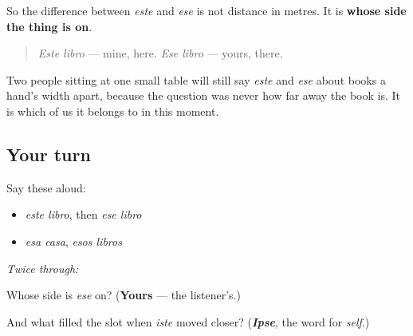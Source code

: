 \begin{culture}
So the difference between \emph{este} and \emph{ese} is not distance in metres. It is \textbf{whose side the thing is on}.

\begin{quote}
\emph{Este libro} — mine, here. \emph{Ese libro} — yours, there.
\end{quote}

Two people sitting at one small table will still say \emph{este} and \emph{ese} about books a hand's width apart, because the question was never how far away the book is. It is which of us it belongs to in this moment.
\end{culture}

\subsection*{Your turn}
Say these aloud:

\begin{itemize}
\raggedright
  \item \emph{este libro}, then \emph{ese libro}
  \item \emph{esa casa}, \emph{esos libros}
\end{itemize}

\emph{Twice through:}

\begin{tcolorbox}[breakable,colback=teal!4,colframe=teal!35!black,title={Before you move on}]
Whose side is \emph{ese} on? (\textbf{Yours} — the listener's.)

And what filled the slot when \emph{iste} moved closer? (\emph{\textbf{Ipse}}, the word for \emph{self}.)
\end{tcolorbox}
